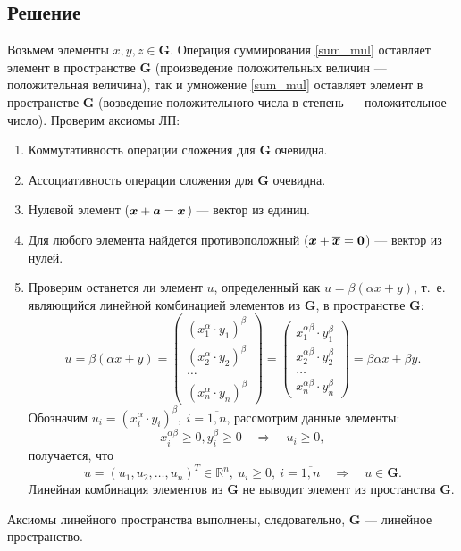 \documentclass[12pt, a4paper]{article}
\renewcommand{\vec}[1]{\text{\mathversion{bold}${#1}$}}%
\begin{document}
		\subsection*{Решение}
			Возьмем элементы $x, y, z \in \mathbf G$. 			
			Операция суммирования \eqref{sum_mul} оставляет элемент в пространстве $\mathbf G$ 
			(произведение положительных величин --- положительная величина), 
			так и умножение \eqref{sum_mul} оставляет элемент в пространстве $\mathbf G$ 
			(возведение положительного числа в степень --- положительное число). Проверим аксиомы ЛП:
			\begin{enumerate}
				\item Коммутативность операции сложения для $\mathbf G$ очевидна.
				\item Ассоциативность операции сложения для $\mathbf G$ очевидна.
				\item Нулевой элемент ($\vec{x} + \vec{a} = \vec{x}$) --- вектор из единиц.
				\item Для любого элемента найдется противоположный ($\vec{x} + \vec{\overline{x}} = \vec{0}$) --- вектор из нулей.
				\item 
				Проверим останется ли элемент $u$, определенный как $u =  \beta (\alpha x + y)$, т.~е. являющийся линейной комбинацией элементов из $ \mathbf G$, в пространстве $\mathbf G$:
				$$
				u = \beta (\alpha x + y) =
				\begin{pmatrix}
					(x_1^{\alpha} \cdot y_1) ^{\beta} \\
					(x_2^{\alpha} \cdot y_2)^{\beta} \\
					\dots \\
					(x_n^{\alpha} \cdot y_n)^{\beta}
				\end{pmatrix}
				= 
				\begin{pmatrix}
					x_1^{\alpha \beta} \cdot y_1^{\beta} \\
					x_2^{\alpha \beta} \cdot y_2^{\beta} \\
					\dots \\
					x_n^{\alpha \beta} \cdot y_n^{\beta}
				\end{pmatrix}
				= \beta \alpha x + \beta y.
				$$
				Обозначим $u_i = (x_i^\alpha \cdot y_i )^\beta, \ i=\overline{1,n}$, рассмотрим данные элементы: 
				$$
				x_i^{\alpha \beta} \geqslant 0, y_i^\beta \geqslant 0 \quad \Rightarrow \quad u_i \geqslant 0,
				$$
				получается, что
				$$
				u = (u_1, u_2, \dots, u_n)^T \in \mathbb{R}^n, \ u_i \geqslant 0, \ i=\overline{1,n} 
				\quad \Rightarrow \quad
				u \in \mathbf{G}.
				$$
				Линейная комбинация элементов из $\mathbf G$ не выводит элемент из простанства $\mathbf G$.
			\end{enumerate}
			 Аксиомы линейного пространства выполнены, следовательно, $\mathbf G$ --- линейное пространство.
			
\end{document}

